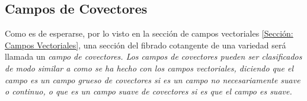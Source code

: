 \subsection{Campos de Covectores}\label{Subsección: Campos de Covectores}
Como es de esperarse, por lo visto en la sección de campos vectoriales \ref{Sección: Campos Vectoriales}, una sección del fibrado cotangente de una variedad será llamada un \it{campo de covectores}. Los campos de covectores pueden ser clasificados de modo similar a como se ha hecho con los campos vectoriales, diciendo que el campo es un \it{campo grueso de covectores} si es un campo no necesariamente suave o continuo, o que es un \it{campo suave de covectores} si es que el campo es suave.
